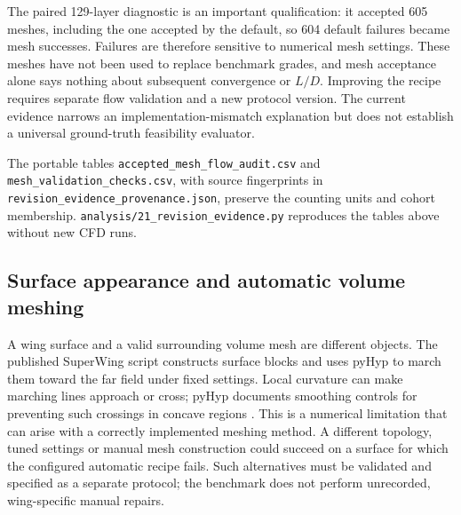 The paired 129-layer diagnostic is an important qualification: it accepted
605 meshes, including the one accepted by the default, so 604 default failures
became mesh successes. Failures are therefore sensitive to numerical mesh
settings. These meshes have not been used to replace benchmark grades, and
mesh acceptance alone says nothing about subsequent convergence or $L/D$.
Improving the recipe requires separate flow validation and a new protocol
version. The current evidence narrows an implementation-mismatch explanation
but does not establish a universal ground-truth feasibility evaluator.

The portable tables \texttt{accepted\_mesh\_flow\_audit.csv} and
\texttt{mesh\_validation\_checks.csv}, with source fingerprints in
\texttt{revision\_evidence\_provenance.json}, preserve the counting units and
cohort membership. \texttt{analysis/21\_revision\_evidence.py} reproduces the
tables above without new CFD runs.

\subsection{Surface appearance and automatic volume meshing}
\label{app:automatic-meshing}

A wing surface and a valid surrounding volume mesh are different objects.
The published SuperWing script constructs surface blocks and uses pyHyp to
march them toward the far field under fixed settings. Local curvature can
make marching lines approach or cross; pyHyp documents smoothing controls
for preventing such crossings in concave regions \citep{mdolabpyhyp}.
This is a numerical limitation that can arise with a correctly implemented
meshing method. A different topology, tuned settings or manual mesh construction
could succeed on a surface for which the configured automatic recipe fails.
Such alternatives must be validated and specified as a separate protocol;
the benchmark does not perform unrecorded, wing-specific manual repairs.

